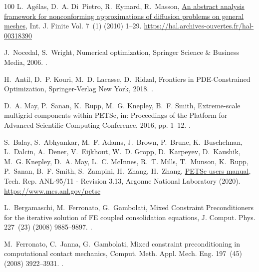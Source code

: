 \documentclass[3p,times]{elsarticle}
\theoremstyle{plain}
\begin{document}
\begin{thebibliography}{100}
L.~Ag\'{e}las, D.~A. Di~Pietro, R.~Eymard, R.~Masson,
  \href{https://hal.archives-ouvertes.fr/hal-00318390}{An abstract analysis
  framework for nonconforming approximations of diffusion problems on general
  meshes}, Int. J. Finite Vol. 7~(1) (2010) 1--29.
\newline\urlprefix\url{https://hal.archives-ouvertes.fr/hal-00318390}

J.~Nocedal, S.~Wright, {Numerical optimization}, Springer Science \& Business
  Media, 2006.
\newblock \href {https://doi.org/10.1007/b98874} {}.

H.~Antil, D.~P. Kouri, M.~D. Lacasse, D.~Ridzal, {Frontiers in PDE-Constrained
  Optimization}, Springer-Verlag New York, 2018.
\newblock \href {https://doi.org/10.1007/978-1-4939-8636-1}
  {}.

D.~A. May, P.~Sanan, K.~Rupp, M.~G. Knepley, B.~F. Smith, {Extreme-scale
  multigrid components within PETSc}, in: Proceedings of the Platform for
  Advanced Scientific Computing Conference, 2016, pp. 1--12.
\newblock \href {https://doi.org/10.1145/2929908.2929913}
  {}.

S.~Balay, S.~Abhyankar, M.~F. Adams, J.~Brown, P.~Brune, K.~Buschelman,
  L.~Dalcin, A.~Dener, V.~Eijkhout, W.~D. Gropp, D.~Karpeyev, D.~Kaushik, M.~G.
  Knepley, D.~A. May, L.~C. McInnes, R.~T. Mills, T.~Munson, K.~Rupp, P.~Sanan,
  B.~F. Smith, S.~Zampini, H.~Zhang, H.~Zhang,
  \href{https://www.mcs.anl.gov/petsc}{{PETS}c users manual}, Tech. Rep.
  ANL-95/11 - Revision 3.13, Argonne National Laboratory (2020).
\newline\urlprefix\url{https://www.mcs.anl.gov/petsc}

L.~Bergamaschi, M.~Ferronato, G.~Gambolati, {Mixed Constraint Preconditioners
  for the iterative solution of FE coupled consolidation equations}, J. Comput.
  Phys. 227~(23) (2008) 9885--9897.
\newblock \href {https://doi.org/10.1016/j.jcp.2008.08.002}
  {}.

M.~Ferronato, C.~Janna, G.~Gambolati, {Mixed constraint preconditioning in
  computational contact mechanics}, Comput. Meth. Appl. Mech. Eng. 197~(45)
  (2008) 3922--3931.
\newblock \href {https://doi.org/10.1016/j.cma.2008.03.008}
  {}.


\end{thebibliography}
\end{document}
